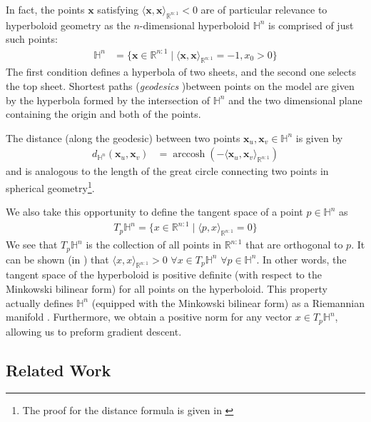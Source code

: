 \documentclass{article}
\DeclareMathOperator{\arccosh}{arccosh}
\begin{document}
In fact, the points $\textbf{x}$ satisfying $\langle \textbf{x}, \textbf{x} \rangle_{\mathbb{R}^{n:1}} < 0$ are of particular relevance to hyperboloid geometry as the $n$-dimensional hyperboloid 	$\mathbb{H}^n$ is comprised of just such points:
\begin{align*}
\mathbb{H}^n &= \{\textbf{x}\in \mathbb{R}^{n:1} \mid \langle \textbf{x},\textbf{x}\rangle_{\mathbb{R}^{n:1}} = -1, x_{0} > 0\} 
\end{align*}
The first condition defines a hyperbola of two sheets, and the second one selects the top sheet.
Shortest paths (\textit{geodesics} )between points on the model are given by the hyperbola formed by the intersection of $\mathbb{H}^n$ and the two dimensional plane containing the origin and both of the points.

The distance (along the geodesic) between two points $\textbf{x}_u,\textbf{x}_v \in \mathbb{H}^n $ is given by
\begin{align*}
d_{\mathbb{H}^n}(\textbf{x}_u, \textbf{x}_v) &= \arccosh(-\langle \textbf{x}_u, \textbf{x}_v \rangle_{\mathbb{R}^{n:1}})
\end{align*}
and is analogous to the length of the great circle connecting two points in spherical geometry\footnote{The proof for the distance formula is given in \cite{reynolds1993hyperbolic}}.

We also take this opportunity to define the tangent space of a point $p\in \mathbb{H}^n$ as 
\begin{align*}
T_p \mathbb{H}^n = \{x \in \mathbb{R}^{n:1} \mid \langle p, x\rangle_{\mathbb{R}^{n:1}} = 0\}
\end{align*}
We see that $T_p \mathbb{H}^n$ is the collection of all points in $\mathbb{R}^{n:1}$ that are orthogonal to $p$.
It can be shown (in \cite{reynolds1993hyperbolic}) that $\langle x, x\rangle_{\mathbb{R}^{n:1}} > 0$ $\forall x \in T_p \mathbb{H}^n$  $\forall p \in \mathbb{H}^n$.
In other words, the tangent space of the hyperboloid is positive definite (with respect to the Minkowski bilinear form) for all points on the hyperboloid.
This property actually defines $\mathbb{H}^n$ (equipped with the Minkowski bilinear form) as a Riemannian manifold \cite{reynolds1993hyperbolic}.
Furthermore, we obtain a positive norm for any vector $x \in T_p \mathbb{H}^n$, allowing us to preform gradient descent.
	
\subsection{Related Work}
\end{document}
